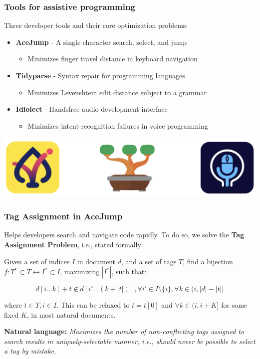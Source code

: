 \documentclass[mathserif,notheorems]{beamer}
\theoremstyle{plain} %
\theoremstyle{definition} %
\begin{document}
\begin{frame}
  \frametitle{Tools for assistive programming}
  Three developer tools and their core optimization problems:\vspace{10pt}

  \begin{itemize}
    \item \textbf{AceJump} - A single character search, select, and jump
    \begin{itemize}\item Minimizes finger travel distance in keyboard navigation\end{itemize}
    \item \textbf{Tidyparse} - Syntax repair for programming languages
    \begin{itemize}\item Minimizes Levenshtein edit distance subject to a grammar\end{itemize}
    \item \textbf{Idiolect} - Handsfree audio development interface
    \begin{itemize}\item Minimizes intent-recognition failures in voice programming\end{itemize}
  \end{itemize}
  \vspace{10pt}
  \begin{center}\includegraphics[scale=0.20]{icons}\end{center}
\end{frame}

\begin{frame}
  \frametitle{Tag Assignment in AceJump}
  Helps developers search and navigate code rapidly. To do so, we solve the \textbf{Tag Assignment Problem}, i.e., stated formally:

\vspace{10pt}
  Given a set of indices $I$ in document $d$, and a set of tags $T$, find a bijection $f: T^*\subset T \leftrightarrow I^*\subset I$, maximizing $|I^*|$, such that:

  \begin{equation*}
    d[i\ldots k] + t \notin d[i'\ldots(k + |t|)], \forall i' \in I\setminus\{i\}, \forall k \in (i, |d| - |t|]
  \end{equation*}

 where $t \in T, i \in I$. This can be relaxed to $t=t[0]$ and $\forall k \in (i, i+K]$ for some fixed $K$, in most natural documents.

  \vspace{10pt}
  \textbf{Natural language:}
  \textit{Maximizes the number of non-conflicting tags assigned to search results in uniquely-selectable manner, i.e., should never be possible to select a tag by mistake.}
\end{frame}
\end{document}
